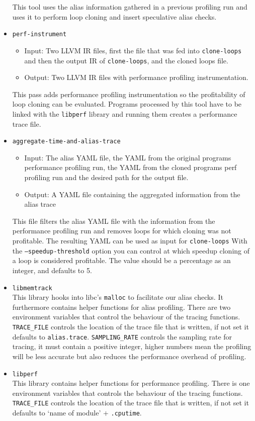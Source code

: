 \documentclass{article}
\begin{document}
\begin{itemize}
\begin{itemize}
		\end{itemize}
		This tool uses the alias information gathered in a previous profiling run and uses it to perform loop cloning and insert speculative alias checks.
	\item \texttt{perf-instrument}\\
		\begin{itemize}
			\item Input:   Two LLVM IR files, first the file that was fed into \texttt{clone-loops} and then the output IR of \texttt{clone-loops}, and the cloned loops file.
			\item Output:  Two LLVM IR files with performance profiling instrumentation.
		\end{itemize}
		This pass adds performance profiling instrumentation so the profitability of loop cloning can be evaluated.
		Programs processed by this tool have to be linked with the \texttt{libperf} library and running them creates a performance trace file.
	\item \texttt{aggregate-time-and-alias-trace}\\
		\begin{itemize}
			\item Input:   The alias YAML file, the YAML from the original programs performance profiling run, the YAML from the cloned programs perf profiling run and the desired path for the output file.
			\item Output:  A YAML file containing the aggregated information from the alias trace
		\end{itemize}
		This file filters the alias YAML file with the information from the performance profiling run and removes loops for which cloning was not profitable.
		The resulting YAML can be used as input for \texttt{clone-loops}
		With the \texttt{--speedup-threshold} option you can control at which speedup cloning of a loop is considered profitable. The value should be a percentage as an integer, and defaults to 5.
	\item \texttt{libmemtrack}\\
		This library hooks into libc's \texttt{malloc} to facilitate our alias checks.
		It furthermore contains helper functions for alias profiling.
		There are two environment variables that control the behaviour of the tracing functions.
		\texttt{TRACE\_FILE} controls the location of the trace file that is written, if not set it defaults to \texttt{alias.trace}.
		\texttt{SAMPLING\_RATE} controls the sampling rate for tracing, it must contain a positive integer, higher numbers mean the profiling will be less accurate but also reduces the performance overhead of profiling.
	\item \texttt{libperf}\\
		This library contains helper functions for performance profiling.
		There is one environment variables that controls the behaviour of the tracing functions.
		\texttt{TRACE\_FILE} controls the location of the trace file that is written, if not set it defaults to `name of module' $+$ \texttt{.cputime}.
\end{itemize}
\end{document}
